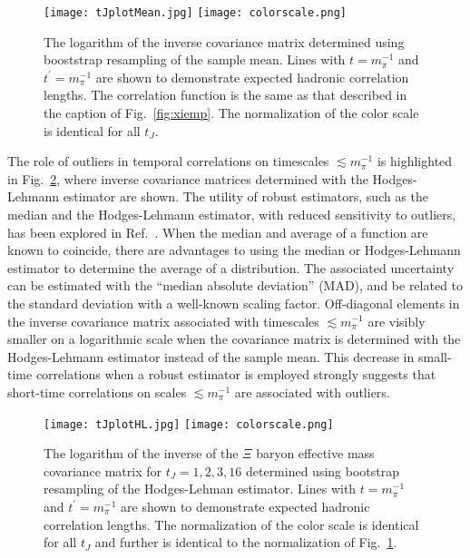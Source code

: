 %
%
\begin{figure}[!ht]
  \texttt{[image: tJplotMean.jpg]}\hspace{5pt}
	\texttt{[image: colorscale.png]}
	\caption{
	\label{fig:jugemean} 
        The logarithm of the inverse covariance matrix determined using booststrap resampling of the sample mean.  
        Lines with $t = m_\pi^{-1}$ and $t^\prime = m_\pi^{-1}$ are shown to demonstrate expected hadronic correlation lengths.
	The correlation function is the same as that described in the caption of Fig.~\protect\ref{fig:xiemp}.
        The normalization of the color scale is identical for all $t_J$.
	}		
\end{figure}
%

The role of outliers in temporal correlations on timescales $\lesssim m_\pi^{-1}$ is highlighted in Fig.~\ref{fig:jugeHL},
where inverse covariance matrices determined with the Hodges-Lehmann estimator are shown.
The utility of robust estimators, such as the median and the Hodges-Lehmann estimator, with reduced sensitivity to outliers, 
has been explored in Ref.~\cite{Beane:2014oea}.  
When the median and  average of a function are known to coincide,   
there are advantages to using 
the median or Hodges-Lehmann estimator
 to determine the average of a distribution. 
 The associated uncertainty can be estimated with the ``median absolute deviation'' (MAD), and be related to the 
 standard deviation with a well-known scaling factor.
Off-diagonal elements in the inverse covariance matrix associated with timescales $\lesssim m_\pi^{-1}$ are visibly
smaller on a logarithmic scale when the covariance matrix is determined with the Hodges-Lehmann estimator instead of the sample mean.
This decrease in small-time correlations when a robust estimator is employed strongly suggests that
short-time correlations on scales $\lesssim m_\pi^{-1}$ are associated with outliers.

%
\begin{figure}[!ht]
  \texttt{[image: tJplotHL.jpg]} \hspace{5pt}
	\texttt{[image: colorscale.png]}
	\caption{
	\label{fig:jugeHL} 
	The logarithm of the inverse of the $\Xi$ baryon effective mass covariance matrix for $t_J = 1,2,3,16$ 
	determined using bootstrap resampling of the Hodges-Lehman estimator. 
        Lines with $t = m_\pi^{-1}$ and $t^\prime = m_\pi^{-1}$ are shown to demonstrate expected hadronic correlation lengths.
        The normalization of the color scale is identical for all $t_J$ and further is identical to the normalization of Fig.~\ref{fig:jugemean}.
	}		
\end{figure}
%




